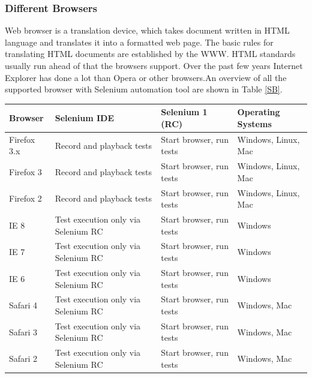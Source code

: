 \documentclass[article,type=msc,colorback,accentcolor=tud9c,twoside,11pt]{tudthesis}
\begin{document}
\subsubsection{Different Browsers}
Web browser is a translation device, which takes document written in HTML language and translates it into a formatted web page. The basic rules for translating HTML documents are established by the WWW. HTML standards usually run ahead of that the browsers support. Over the past few years Internet Explorer has done a lot than Opera or other browsers.An overview of all the supported browser with Selenium automation tool are shown in Table \ref{SB}.
\begin{table}[H]
\centering
\begin{tabular}{|l|l|l|l|}
	\hline
	\textbf{Browser} & \textbf{Selenium IDE} & \textbf{Selenium 1 (RC)} 
	& \textbf{Operating Systems}\\ \hline
	Firefox 3.x   & Record and playback tests             & Start browser, run tests  & Windows, Linux, Mac    \\ \hline
	
	Firefox 3  & Record and playback tests             & Start browser, run tests  & Windows, Linux, Mac    \\ \hline
	
	Firefox 2  & Record and playback tests             & Start browser, run tests  & Windows, Linux, Mac    \\ \hline
	
	IE 8  & Test execution only via Selenium RC             & Start browser, run tests  & Windows    \\ \hline
	
	IE 7  & Test execution only via Selenium RC             & Start browser, run tests  & Windows    \\ \hline
	
	IE 6  & Test execution only via Selenium RC             & Start browser, run tests  & Windows    \\ \hline
	
	Safari 4  & Test execution only via Selenium RC             & Start browser, run tests  & Windows, Mac    \\ \hline
	
	Safari 3  & Test execution only via Selenium RC             & Start browser, run tests  & Windows, Mac    \\ \hline
	
	Safari 2  & Test execution only via Selenium RC             & Start browser, run tests  & Windows, Mac    \\ \hline
	

\end{tabular}
\end{table}
\end{document}
